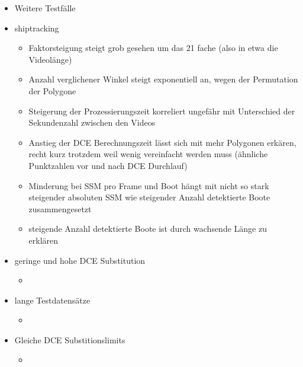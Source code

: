 {\begin{itemize}
\begin{itemize}
			\item Verdoppelung der Absoluten SSM bei LKW so hoch, weil LKW mehr Punkte haben, bei 8m und 8x nicht mehr so starke Steigung
			\item Da alle anderen Werte vom SSM abhängen ist dies auch bei den anderen Werten der Fall
			\item Bei dem Zug/Bus ist die Verringerung durch die besseren Modelle zu erklären, da die Modelle genauer und besser Autos/LKW detektieren, ist insbesondere bei 8x zu sehen wo nur noch 1 Zug falsch detektiert wird und kein Bus mehr (Folgerung besser trainiertes Modell gleich bessere Erkennungsleistung -> Logisch)
		\end{itemize}
		\item Weitere Testfälle
		\item shiptracking
		\begin{itemize}
			\item Faktorsteigung steigt grob gesehen um das 21 fache (also in etwa die Videolänge)
			\item Anzahl verglichener Winkel steigt exponentiell an, wegen der Permutation der Polygone
			\item Steigerung der Prozessierungszeit korreliert ungefähr mit Unterschied der Sekundenzahl zwischen den Videos
			\item Anstieg der DCE Berechnungszeit lässt sich mit mehr Polygonen erkären, recht kurz trotzdem weil wenig vereinfacht werden muss (ähnliche Punktzahlen vor und nach DCE Durchlauf)
			\item Minderung bei SSM pro Frame und Boot hängt mit nicht so stark steigender absoluten SSM wie steigender Anzahl detektierte Boote zusammengesetzt
			\item steigende Anzahl detektierte Boote ist durch wachsende Länge zu erklären
		\end{itemize}
		\item geringe und hohe DCE Substitution
		\begin{itemize}
			\item 
		\end{itemize}
		\item lange Testdatensätze
		\begin{itemize}
			\item 
		\end{itemize}
		\item Gleiche DCE Substitionslimits
		\begin{itemize}
			\item 
		\end{itemize}
	\end{itemize}



}
		
